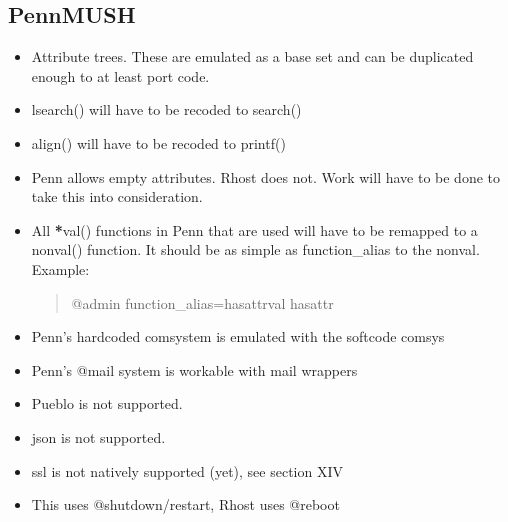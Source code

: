 \documentclass[letterpaper,10pt,english]{sphinxmanual}
\begin{document}
\subsection{PennMUSH}
\label{\detokenize{12-advanced:pennmush}}\begin{itemize}
\item {} 
\sphinxAtStartPar
Attribute trees.  These are emulated as a base set and can be
duplicated enough to at least port code.

\item {} 
\sphinxAtStartPar
lsearch() will have to be recoded to search()

\item {} 
\sphinxAtStartPar
align() will have to be recoded to printf()

\item {} 
\sphinxAtStartPar
Penn allows empty attributes.  Rhost does not.  Work will have to
be done to take this into consideration.

\item {} 
\sphinxAtStartPar
All {\color{red}\bfseries{}*}val() functions in Penn that are used will have to be
remapped to a non\sphinxhyphen{}{\color{red}\bfseries{}*}val() function.  It should be as simple as
function\_alias to the non\sphinxhyphen{}{\color{red}\bfseries{}*}val.  Example:
\begin{quote}

\sphinxAtStartPar
@admin function\_alias=hasattrval hasattr
\end{quote}

\item {} 
\sphinxAtStartPar
Penn’s hardcoded comsystem is emulated with the softcode comsys

\item {} 
\sphinxAtStartPar
Penn’s @mail system is workable with mail wrappers

\item {} 
\sphinxAtStartPar
Pueblo is not supported.

\item {} 
\sphinxAtStartPar
json is not supported.

\item {} 
\sphinxAtStartPar
ssl is not natively supported (yet), see section XIV

\item {} 
\sphinxAtStartPar
This uses @shutdown/restart, Rhost uses @reboot

\end{itemize}
\end{document}
